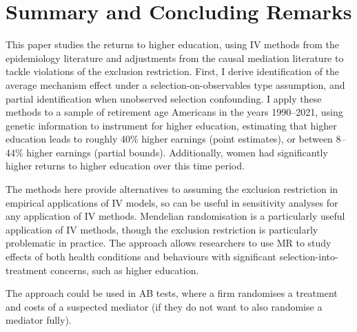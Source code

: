 \section{Summary and Concluding Remarks}
\label{sec:conclusion}

This paper studies the returns to higher education, using IV methods from the epidemiology literature and adjustments from the causal mediation literature to tackle violations of the exclusion restriction.
First, I derive identification of the average mechanism effect under a selection-on-observables type assumption, and partial identification when unobserved selection confounding.
I apply these methods to a sample of retirement age Americans in the years 1990--2021, using genetic information to instrument for higher education, estimating that higher education leads to roughly 40\% higher earnings (point estimates), or between 8--44\% higher earnings (partial bounds).
Additionally, women had significantly higher returns to higher education over this time period.

The methods here provide alternatives to assuming the exclusion restriction in empirical applications of IV models, so can be useful in sensitivity analyses for any application of IV methods.
Mendelian randomisation is a particularly useful application of IV methods, though the exclusion restriction is particularly problematic in practice.
The approach allows researchers to use MR to study effects of both health conditions and behaviours with significant selection-into-treatment concerns, such as higher education.

The approach could be used in AB tests, where a firm randomises a treatment and costs of a suspected mediator (if they do not want to also randomise a mediator fully).
